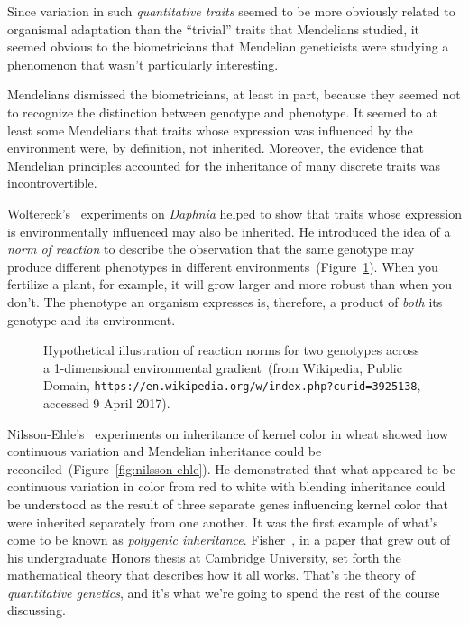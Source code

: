 \documentclass[12pt]{article}
\begin{document}
\noindent Since variation in such {\it quantitative traits\/} seemed
to be more obviously related to organismal adaptation than the
``trivial'' traits that Mendelians studied, it seemed obvious to the
biometricians that Mendelian geneticists were studying a phenomenon
that wasn't particularly interesting.

Mendelians dismissed the biometricians, at least in part, because they
seemed not to recognize the distinction between genotype and
phenotype. It seemed to at least some Mendelians that traits whose
expression was influenced by the environment were, by definition, not
inherited. Moreover, the evidence that Mendelian principles accounted
for the inheritance of many discrete traits was incontrovertible.

Woltereck's~\cite{Woltereck-1909} experiments on {\it Daphnia\/}
helped to show that traits whose expression is environmentally
influenced may also be inherited. He introduced the idea of a {\it
  norm of reaction} to describe the observation that the same genotype
may produce different phenotypes in different
environments~(Figure~\ref{fig:norm-of-reaction}). When you fertilize a
plant, for example, it will grow larger and more robust than when you
don't. The phenotype an organism expresses is, therefore, a product of
{\it both\/} its genotype and its environment.

\begin{figure}
\begin{center}
\end{center}
\caption{Hypothetical illustration of reaction norms for two genotypes
  across a 1-dimensional environmental gradient~(from Wikipedia,
  Public Domain,
  {\tt https://en.wikipedia.org/w/index.php?curid=3925138}, accessed 9
  April 2017).}\label{fig:norm-of-reaction}
\end{figure}

Nilsson-Ehle's~\cite{NilssonEhle-1909} experiments on inheritance of
kernel color in wheat showed how continuous variation and Mendelian
inheritance could be reconciled~(Figure~\ref{fig:nilsson-ehle}). He
demonstrated that what appeared to be continuous variation in color
from red to white with blending inheritance could be understood as the
result of three separate genes influencing kernel color that were
inherited separately from one another. It was the first example of
what's come to be known as {\it polygenic inheritance}. Fisher~\cite{Fisher-1918}, in a paper that grew out of
his undergraduate Honors thesis at Cambridge University, set forth the
mathematical theory that describes how it all works. That's the theory
of {\it quantitative genetics}, and it's what we're going to spend the
rest of the course discussing.
\end{document}
